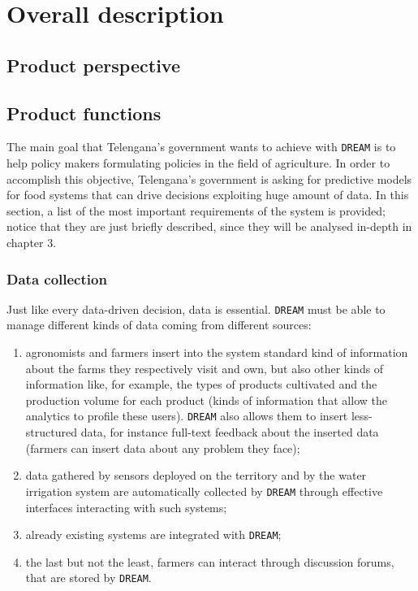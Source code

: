 \documentclass{article}
\begin{document}
\section{Overall description}
\subsection{Product perspective}
\subsection{Product functions} \label{Product functions}
The main goal that Telengana’s government wants to achieve with \verb|DREAM| is to help policy makers 
formulating policies in the field of agriculture. In order to accomplish this objective, Telengana’s 
government is asking for predictive models for food systems that can drive decisions exploiting huge 
amount of data. In this section, a list of the most important requirements of the system is provided; notice 
that they are just briefly described, since they will be analysed in-depth in chapter 3.
\subsubsection{Data collection}
Just like every data-driven decision, data is essential. \verb |DREAM| must be able to manage different kinds of data coming from different sources:
\begin{enumerate}
\item agronomists and farmers insert into the system standard kind of information about the farms they 
respectively visit and own, but also other kinds of information like, for example, the types of products 
cultivated and the production volume for each product (kinds of information that allow the analytics to 
profile these users). \verb |DREAM| also allows them to insert less-structured data, for instance full-text feedback 
about the inserted data (farmers can insert data about any problem they face);
\item data gathered by sensors deployed on the territory and by the water irrigation system are automatically 
collected by \verb|DREAM| through effective interfaces interacting with such systems;
\item already existing systems are integrated with \verb|DREAM|;
\item the last but not the least, farmers can interact through discussion forums, that are stored by \verb|DREAM|.
\end{enumerate}
\end{document}
